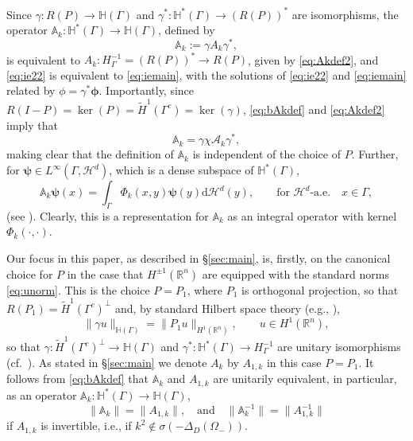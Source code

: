 \documentclass{birkjour}
\theoremstyle{definition}
\theoremstyle{remark}
\numberwithin{equation}{section}
\newcommand{\R}{\mathbb{R}}
\newcommand{\cA}{\mathcal{A}}
\newcommand{\cH}{\mathcal{H}}
\newcommand{\rd}{\mathrm{d}}
\newcommand{\bA}{\mathbb{A}}
\newcommand{\bH}{\mathbb{H}}
\newcommand{\bphi}{\boldsymbol{\phi}}
\newcommand{\bpsi}{\boldsymbol{\psi}}
\begin{document}
Since $\gamma:R(P) \to \bH(\Gamma)$ and  $\gamma^*:\bH^*(\Gamma)\to (R(P))^*$ are isomorphisms, the operator $\bA_k:\bH^*(\Gamma)\to \bH(\Gamma)$, defined by
\begin{equation} \label{eq:bAkdef}
\bA_k := \gamma A_k \gamma^*,
\end{equation}
is equivalent to $A_k:H_\Gamma^{-1}=(R(P))^*\to R(P)$, given by  \eqref{eq:Akdef2}, and \eqref{eq:ie22} is equivalent to \eqref{eq:iemain}, with the solutions of   \eqref{eq:ie22} and \eqref{eq:iemain} related by $\phi = \gamma^* \bphi$. Importantly, since $R(I-P)=\ker(P)=\widetilde H^1(\Gamma^c)=\ker(\gamma)$, \eqref{eq:bAkdef} and \eqref{eq:Akdef2} imply that
$$
\bA_k = \gamma \chi \cA_k \gamma^*,
$$
making clear that the definition of $\bA_k$ is independent of the choice of $P$.
Further, for $\bpsi\in L^\infty(\Gamma,\cH^d)$, which is a dense subspace of $\bH^*(\Gamma)$,
\begin{equation} \label{eq:bAk2}
\bA_k \bpsi(x) = \int_\Gamma \Phi_k(x,y)\bpsi(y) \rd \cH^d(y), \qquad \mbox{for } \cH^d\mbox{-a.e.} \quad x\in \Gamma,
\end{equation}
(see \cite[Theorem 3.16(iii)]{caetano2025integral}). Clearly, this is a representation for $\bA_k$ as an integral operator with kernel $\Phi_k(\cdot,\cdot)$.


Our focus in this paper, as described in \S\ref{sec:main}, is, firstly, on the canonical choice for $P$ in the case that $H^{\pm1}(\R^n)$ are equipped with the standard norms  \eqref{eq:unorm}. This is the choice $P=P_1$, where $P_1$ is orthogonal projection, so that $R(P_1) = \widetilde H^1(\Gamma^c)^\perp$ and, by standard Hilbert space theory (e.g., \cite[Theorem 4.11]{Rudin}),
\begin{equation} \label{eq:normbH}
\|\gamma u\|_{\bH(\Gamma)} = \|P_1 u\|_{H^1(\R^n)}, \qquad u\in H^1(\R^n),
\end{equation}
so that $\gamma:\widetilde H^1(\Gamma^c)^\perp \to \bH(\Gamma)$ and $\gamma^*:\bH^*(\Gamma)\to H^{-1}_\Gamma$ are unitary isomorphisms (cf.~\cite[Theorem 3.9]{caetano2025integral}). As stated in \S\ref{sec:main} we denote $A_k$ by $A_{1,k}$ in this case $P=P_1$.  It follows from \eqref{eq:bAkdef} that $\bA_k$ and $A_{1,k}$ are unitarily equivalent, in particular, as an operator $\bA_k:\bH^*(\Gamma)\to \bH(\Gamma)$,
\begin{equation} \label{eq:bAknorm}
\|\bA_{k}\| = \|A_{1,k}\|, \quad \mbox{and} \quad \|\bA_{k}^{-1}\| = \|A_{1,k}^{-1}\|
\end{equation}
if $A_{1,k}$ is invertible, i.e., if $k^2\not\in \sigma(-\Delta_D(\Omega_-))$. 
\end{document}
